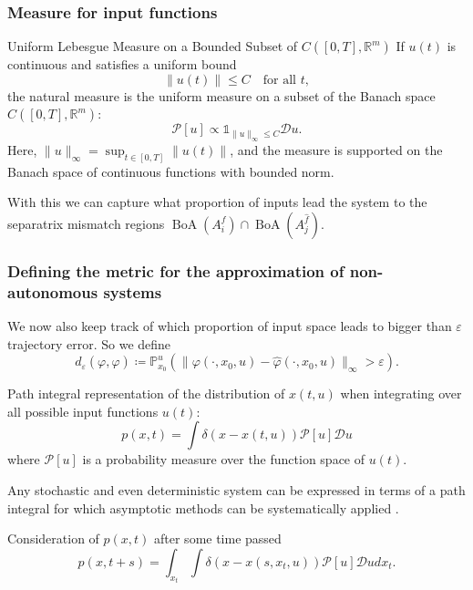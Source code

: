 \documentclass{article}
\theoremstyle{definition} \newtheorem{definition}{Definition}
\theoremstyle{remark} \newtheorem{remark}{Remark}
\newcommand{\reals}{\mathbb{R}}
\newcommand{\boa}{\operatorname{BoA}}
\newcounter{ct}
\begin{document}
\subsubsection{Measure for input functions}\label{sec:inputspace_measure}
Uniform Lebesgue Measure on a Bounded Subset of \( C([0,T], \reals^m) \)
If \( u(t) \) is continuous and satisfies a uniform bound
\[
\|u(t)\| \leq C \quad \text{for all } t,
\]
the natural measure is the uniform measure on a subset of the Banach space \( C([0,T], \reals^m) \):
\[
\mathcal{P}[u] \propto \mathds{1}_{\|u\|_\infty \leq C} \mathcal{D} u.
\]
Here, \( \|u\|_\infty = \sup_{t \in [0,T]} \|u(t)\| \), and the measure is supported on the Banach space of continuous functions with bounded norm.

With this we can capture what proportion of inputs lead the system to the separatrix mismatch regions $\boa(A_i^f)\cap\boa(A_j^{\hat{f}})$. %

\subsubsection{Defining the metric for the approximation of non-autonomous systems}\label{sec:inputdriven_metric}
We now also keep track of which proportion of input space leads to bigger than $\varepsilon$ trajectory error.
So we define 
\begin{equation}%
d_\varepsilon(\varphi,\hat \varphi) \coloneqq  \mathbb{P}_{x_0}^{u}\left(\|\varphi(\cdot,x_0,u)-\hat \varphi(\cdot,x_0,u)\|_\infty>\varepsilon\right).
\end{equation}


Path integral representation of the distribution of $x(t,u)$ when integrating over all possible input functions $u(t)$:
\begin{equation}
    p(x,t) = \int \delta(x - x(t, u)) \mathcal{P}[u] \mathcal{D}u
\end{equation}
where $\mathcal{P}[u]$ is a probability measure over the function space of $u(t)$.

Any stochastic and even deterministic system can be expressed in terms of a path integral for which asymptotic methods can be systematically applied \citep{chow2015path}.


Consideration of $p(x,t)$ after some time passed %
\begin{equation}
    p(x,t+s) = \int_{x_t} \int \delta(x - x(s, x_t, u)) \mathcal{P}[u] \mathcal{D}u dx_t.
\end{equation}
\end{document}
